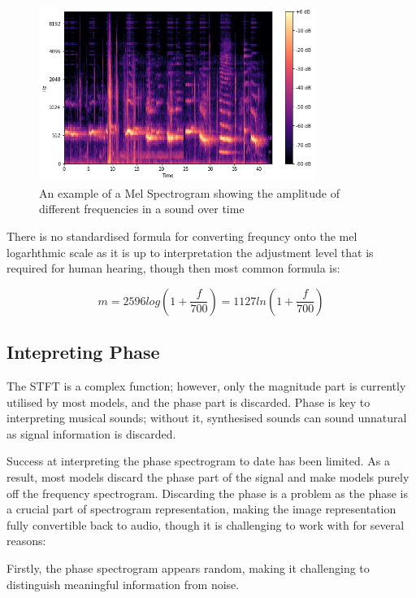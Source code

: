 \begin{figure}[H]
    \centering
    \includegraphics[width=0.8\textwidth]{literature_review/MelSpectrogram.png}
    \caption{An example of a  Mel Spectrogram showing the amplitude of different frequencies in a sound over time\cite{GettingToKnowTheMelSpectrogram}}
    \label{fig:spectrograms}
\end{figure}

There is no standardised formula for converting frequncy onto the mel logarhthmic scale as it is up to interpretation the adjustment level that is required for human hearing, though then most common formula is\cite{SpeechCommunication}:

\begin{equation}
    m = 2596 log(1 +  \frac{f}{700}) = 1127 ln (1 + \frac{f}{700})
\end{equation}

\subsection{Intepreting Phase}

The STFT is a complex function; however, only the magnitude part is currently utilised by most models, and the phase part is discarded. Phase is key to interpreting musical sounds; without it, synthesised sounds can sound unnatural as signal information is discarded.

Success at interpreting the phase spectrogram to date has been limited. As a result, most models discard the phase part of the signal and make models purely off the frequency spectrogram. Discarding the phase is a problem as the phase is a crucial part of spectrogram representation, making the image representation fully convertible back to audio, though it is challenging to work with for several reasons:

Firstly, the phase spectrogram appears random, making it challenging to distinguish meaningful information from noise.

